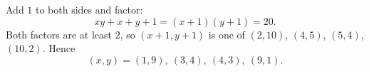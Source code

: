 Add $1$ to both sides and factor:
\[
xy+x+y+1=(x+1)(y+1)=20 .
\]
Both factors are at least $2$, so $(x+1,y+1)$ is one of $(2,10)$, $(4,5)$, $(5,4)$, $(10,2)$. Hence
\[
(x,y)=\boxed{(1,9),\ (3,4),\ (4,3),\ (9,1)}.
\]
